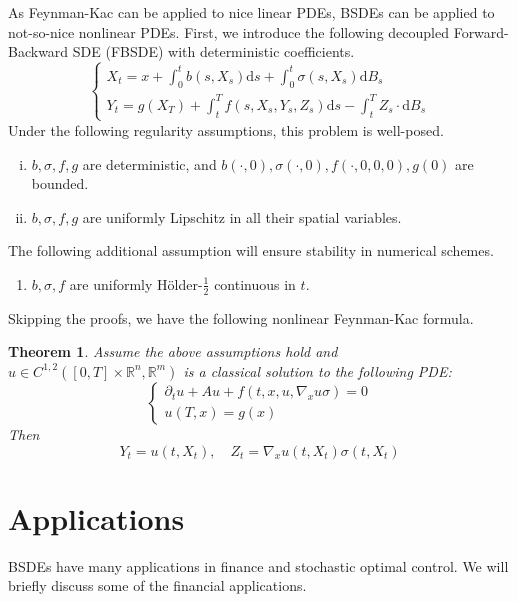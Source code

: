 \documentclass{amsart}
\newcommand{\rr}{\mathbb R}    %
\newtheorem{theorem}{Theorem}
\theoremstyle{definition}
\theoremstyle{remark}
\numberwithin{equation}{section}
\begin{document}
As Feynman-Kac can be applied to nice linear PDEs, BSDEs can be applied to not-so-nice nonlinear PDEs. 
First, we introduce the following decoupled Forward-Backward SDE (FBSDE) with deterministic coefficients.
\begin{equation}
    \begin{cases}
        X_t = x + \int_0^t b(s, X_s) \mathrm{d} s + \int_0^t \sigma(s, X_s) \mathrm{d} B_s \\
        Y_t = g(X_T) + \int_t^T f(s, X_s, Y_s, Z_s) \mathrm{d} s - \int_t^T Z_s \cdot \mathrm{d} B_s
    \end{cases}
\end{equation}
Under the following regularity assumptions, this problem is well-posed. 
\begin{enumerate}[i)]
    \item $b, \sigma, f, g$ are deterministic, and $b(\cdot, 0), \sigma(\cdot, 0), f(\cdot, 0, 0, 0) , g(0)$ are bounded.
    \item $b, \sigma, f, g$ are uniformly Lipschitz in all their spatial variables.
\end{enumerate}
The following additional assumption will ensure stability in numerical schemes.
\begin{enumerate}
    \item[iii)] $b, \sigma, f$ are uniformly H\"older-$\frac12$ continuous in $t$.
\end{enumerate}
Skipping the proofs, we have the following nonlinear Feynman-Kac formula.
\begin{theorem}
    Assume the above assumptions hold and $u \in C^{1, 2}([0, T] \times \rr^n, \rr^m)$ is a classical solution to the following PDE:
    \begin{equation}
        \begin{cases}
            \partial_t u + A u + f(t, x, u, \nabla_x u\sigma) = 0\\
            u(T, x) = g(x)
        \end{cases}
    \end{equation}
    Then 
    \begin{equation}
        Y_t = u(t, X_t), \quad Z_t = \nabla_x u(t, X_t) \sigma(t, X_t)
    \end{equation}
\end{theorem}


\section{Applications}
BSDEs have many applications in finance and stochastic optimal control. 
We will briefly discuss some of the financial applications. 
\end{document}
